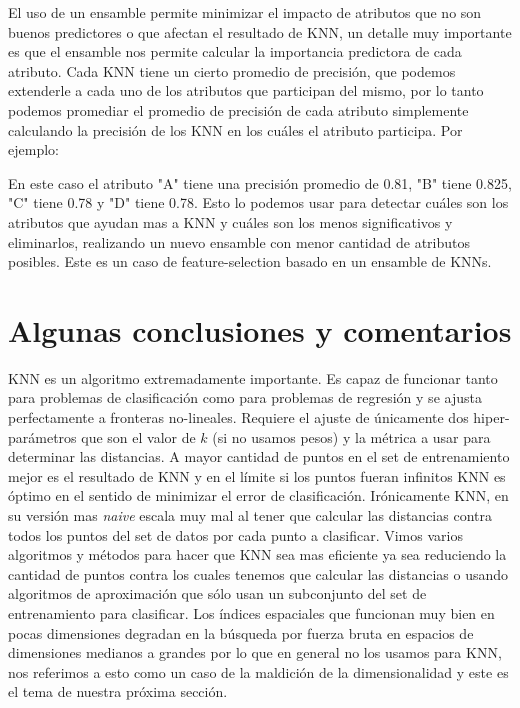 El uso de un ensamble permite minimizar el impacto de atributos que no son buenos predictores o que afectan el resultado de KNN, un detalle muy importante es que el ensamble nos permite calcular la importancia predictora de cada atributo. Cada KNN tiene un cierto promedio de precisión, que podemos extenderle a cada uno de los atributos que participan del mismo, por lo tanto podemos promediar el promedio de precisión de cada atributo simplemente calculando la precisión de los KNN en los cuáles el atributo participa. Por ejemplo:

\begin{table}[!hbt]
\caption{Ejemplo de un ensamble de 4 KNNs con 3 atributos sobre un total de 5}
\end{table}

En este caso el atributo "A" tiene una precisión promedio de 0.81, "B" tiene 0.825, "C" tiene 0.78 y "D" tiene 0.78. Esto lo podemos usar para detectar cuáles son los atributos que ayudan mas a KNN y cuáles son los menos significativos y eliminarlos, realizando un nuevo ensamble con menor cantidad de atributos posibles. Este es un caso de feature-selection basado en un ensamble de KNNs.

\section{Algunas conclusiones y comentarios}

KNN es un algoritmo extremadamente importante. Es capaz de funcionar tanto para problemas de clasificación como para problemas de regresión y se ajusta perfectamente a fronteras no-lineales. Requiere el ajuste de únicamente dos hiper-parámetros que son el valor de $k$ (si no usamos pesos) y la métrica a usar para determinar las distancias. A mayor cantidad de puntos en el set de entrenamiento mejor es el resultado de KNN y en el límite si los puntos fueran infinitos KNN es óptimo en el sentido de minimizar el error de clasificación. Irónicamente KNN, en su versión mas \textit{naive} escala muy mal al tener que calcular las distancias contra todos los puntos del set de datos por cada punto a clasificar. Vimos varios algoritmos y métodos para hacer que KNN sea mas eficiente ya sea reduciendo la cantidad de puntos contra los cuales tenemos que calcular las distancias o usando algoritmos de aproximación que sólo usan un subconjunto del set de entrenamiento para clasificar. Los índices espaciales que funcionan muy bien en pocas dimensiones degradan en la búsqueda por fuerza bruta en espacios de dimensiones medianos a grandes por lo que en general no los usamos para KNN, nos referimos a esto como un caso de la maldición de la dimensionalidad y este es el tema de nuestra próxima sección.

